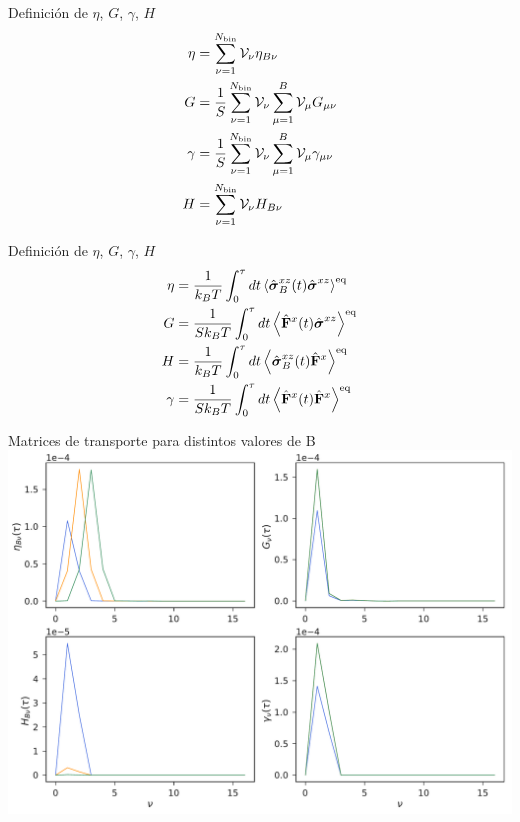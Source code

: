 \documentclass{beamer}
\begin{document}
\begin{frame}{Definición de $\eta$, $G$, $\gamma$, $H$}
\begin{align}
  \eta&= \sum^{N_{\rm bin}}_{\nu=1} {\cal V}_\nu \eta_{B\nu}
\nonumber\\
G &=  \frac{1}{S} \sum^{N_{\rm bin}}_{\nu=1} {\cal V}_\nu \sum^{B}_{\mu=1}{\cal V}_\mu G_{\mu\nu}
\nonumber\\
\gamma&=  \frac{1}{S}\sum^{N_{\rm bin}}_{\nu=1}{\cal V}_\nu\sum^{B}_{\mu=1}{\cal V}_\mu \gamma_{\mu\nu}
\nonumber\\
H&= \sum^{N_{\rm bin}}_{\nu=1} {\cal V}_\nu H_{B\nu}
\nonumber
\end{align}
\end{frame}

\begin{frame}{Definición de $\eta$, $G$, $\gamma$, $H$}
\begin{align}
\eta&= \frac{1}{k_BT}\int_0^{\tau} dt
\left\langle  \hat{\boldsymbol{\sigma}}^{xz}_{B}(t) \hat{\boldsymbol{\sigma}}^{xz}\right\rangle^{\rm eq}
\nonumber\\
G &=   \frac{1}{Sk_BT}\int_0^{\tau} dt
\left\langle  \hat{\bf F}^{x}(t) \hat{\boldsymbol{\sigma}}^{xz}\right\rangle^{\rm eq}
\nonumber\\
H &=   \frac{1}{k_BT}\int_0^{\tau} dt
\left\langle  \hat{\boldsymbol{\sigma}}^{xz}_{B}(t) \hat{\bf F}^{x}\right\rangle^{\rm eq}
\nonumber\\
\gamma&= 
\frac{1}{Sk_BT}\int_0^{\tau} dt
\left\langle  \hat{\bf F}^{x}(t)\hat{\bf F}^{x}\right\rangle^{\rm eq}
\nonumber
\end{align}


\end{frame}

\begin{frame}{Matrices de transporte para distintos valores de B}
\includegraphics[width=\linewidth]{transportMatrices-17nodes-WALLS}
\end{frame}
\end{document}
